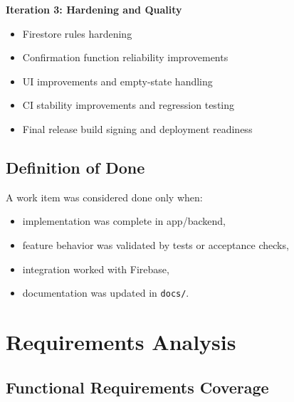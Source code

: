 \documentclass[12pt,a4paper]{article}
\begin{document}
\textbf{Iteration 3: Hardening and Quality}
\begin{itemize}
    \item Firestore rules hardening
    \item Confirmation function reliability improvements
    \item UI improvements and empty-state handling
    \item CI stability improvements and regression testing
    \item Final release build signing and deployment readiness
\end{itemize}

\subsection{Definition of Done}

A work item was considered done only when:
\begin{itemize}
    \item implementation was complete in app/backend,
    \item feature behavior was validated by tests or acceptance checks,
    \item integration worked with Firebase,
    \item documentation was updated in \texttt{docs/}.
\end{itemize}

\section{Requirements Analysis}

\subsection{Functional Requirements Coverage}
\end{document}
